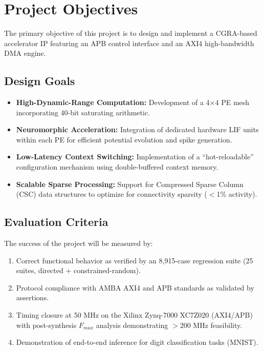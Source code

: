 \section{Project Objectives}

The primary objective of this project is to design and implement a CGRA-based accelerator IP featuring an APB control interface and an AXI4 high-bandwidth DMA engine.

\subsection{Design Goals}
\begin{itemize}
    \item \textbf{High-Dynamic-Range Computation:} Development of a 4×4 PE mesh incorporating 40-bit saturating arithmetic.
    \item \textbf{Neuromorphic Acceleration:} Integration of dedicated hardware LIF units within each PE for efficient potential evolution and spike generation.
    \item \textbf{Low-Latency Context Switching:} Implementation of a ``hot-reloadable'' configuration mechanism using double-buffered context memory.
    \item \textbf{Scalable Sparse Processing:} Support for Compressed Sparse Column (CSC) data structures to optimize for connectivity sparsity ($<$1\% activity).
\end{itemize}

\subsection{Evaluation Criteria}
The success of the project will be measured by:
\begin{enumerate}
    \item Correct functional behavior as verified by an 8,915-case regression suite (25 suites, directed + constrained-random).
    \item Protocol compliance with AMBA AXI4 and APB standards as validated by assertions.
    \item Timing closure at 50 MHz on the Xilinx Zynq-7000 XC7Z020 (AXI4/APB) with post-synthesis $F_{max}$ analysis demonstrating $>$200 MHz feasibility.
    \item Demonstration of end-to-end inference for digit classification tasks (MNIST).
\end{enumerate}
